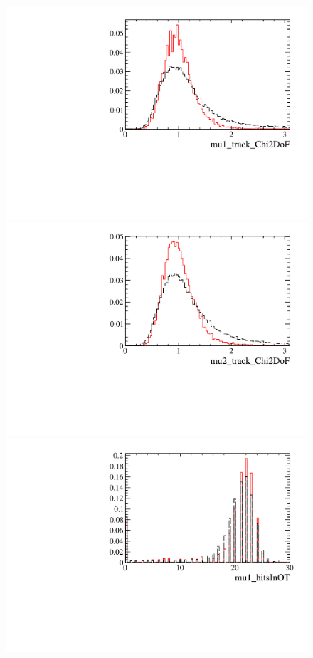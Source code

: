 \documentclass[12pt,a4paper]{article}
\begin{document}
\begin{figure} [htb!]
\begin{center}
\includegraphics[scale=0.20]{figs/mu1_track_Chi2DoFPARTIALptcut.pdf}
\includegraphics[scale=0.20]{figs/mu2_track_Chi2DoFPARTIALptcut.pdf}
\includegraphics[scale=0.20]{figs/mu1_hitsInOTPARTIALptcut.pdf}

\end{center}
\end{figure}
\end{document}
